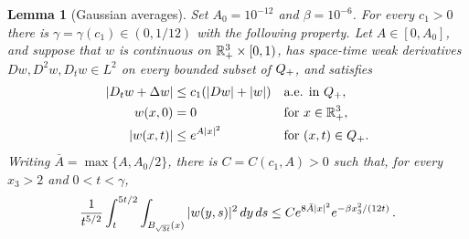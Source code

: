 \documentclass[11pt,letterpaper]{article}
\numberwithin{equation}{section}
\theoremstyle{plain}
\newtheorem{lemma}[theorem]{Lemma}
\theoremstyle{definition}
\theoremstyle{remark}
\begin{document}
\pagebreak[4]

\begin{lemma}[Gaussian averages]\label{lem:bu-gaussian}
Set $A_0=10^{-12}$ and $\beta=10^{-6}$. For every $c_1>0$ there is
$\gamma=\gamma(c_1)\in(0,1/12)$ with the following property. Let
$A\in[0,A_0]$, and suppose that $w$ is continuous on
$\mathbb{R}^3_+\times[0,1)$, has space-time weak derivatives
$Dw,D^2w,D_tw\in L^2$ on every bounded subset of $Q_+$, and satisfies
\begin{align*}
  |D_tw+\Delta w|&\le c_1(|Dw|+|w|) &&\text{a.e. in }Q_+,\\
  w(x,0)&=0 &&\text{for }x\in\mathbb{R}^3_+,\\
  |w(x,t)|&\le e^{A|x|^2} &&\text{for }(x,t)\in Q_+.
\end{align*}
Writing $\bar A=\max\{A,A_0/2\}$, there is
$C=C(c_1,A)>0$ such that, for every $x_3>2$ and $0<t<\gamma$,
\begin{equation}\label{eq:bu-gaussian-average}
  \frac{1}{t^{5/2}}
  \int_t^{5t/2}\int_{B_{\sqrt{3t}}(x)} |w(y,s)|^2\,dy\,ds
  \le C e^{8\bar A|x|^2}e^{-\beta x_3^2/(12t)}\,.
\end{equation}
\end{lemma}
\end{document}
